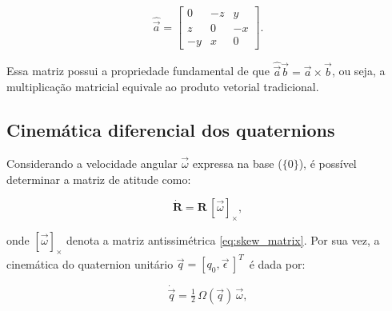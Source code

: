 \begin{equation}
    \label{eq:matriz_assimetrica}
    \hat{\vec{a}} = 
    \begin{bmatrix}
        0   & -z  &  y \\
        z   &  0  & -x \\
        -y  &  x  &  0
    \end{bmatrix}.
\end{equation}

Essa matriz possui a propriedade fundamental de que
$\hat{\vec{a}}\vec{b} = \vec{a} \times \vec{b}$,
ou seja, a multiplicação matricial equivale ao produto vetorial tradicional.

\subsection{Cinemática diferencial dos quaternions}
\label{sec:cinematica_diferencial_quaternions}

Considerando a velocidade angular $\vec \omega$ expressa na base ($\{0\}$), é possível determinar a matriz de atitude como:

\begin{equation}
    \label{eq:dotR_base}
\dot{\mathbf{R}}
=
\mathbf{R}\,[\vec{\omega}]_{\times},
\end{equation}

onde $[\vec{\omega}]_{\times}$ denota a matriz antissimétrica \eqref{eq:skew_matrix}.
Por sua vez, a cinemática do quaternion unitário
$\vec{q}=[q_{0},\vec{\epsilon}\,]^{T}\,$
é dada por:


\begin{equation}
    \label{eq:definicao_qdot}
\dot{\vec{q}}
=
\tfrac{1}{2}\,\Omega(\vec{q})\,\vec{\omega},
\end{equation}


